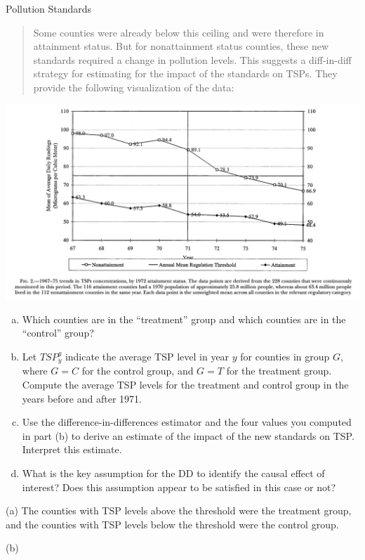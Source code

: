 \documentclass[10pt]{extarticle}
\begin{document}
\begin{problem}{Pollution Standards}
\begin{quote}
      Some counties were already below this ceiling and were therefore in attainment status. But for nonattainment status counties, these new standards required a change in pollution levels. This suggests a diff-in-diff strategy for estimating for the impact of the standards on TSPs. They provide the following visualization of the data:
    \end{quote}
    \begin{center}
      \includegraphics[width=\textwidth]{2_1_q}
    \end{center}
    \begin{enumerate}[(a)]
      \item Which counties are in the ``treatment'' group and which counties are in the ``control'' group?
      \item Let $TSP_{y}^{g}$ indicate the average TSP level in year $y$ for counties in group $G$, where $G = C$ for the control group, and $G = T$ for the treatment group. Compute the average TSP levels for the treatment and control group in the years before and after 1971.
      \item Use the difference-in-differences estimator and the four values you computed in part (b) to derive an estimate of the impact of the new standards on TSP. Interpret this estimate.
      \item What is the key assumption for the DD to identify the causal effect of interest? Does this assumption appear to be satisfied in this case or not?
    \end{enumerate}
    \tcblower
    \begin{problem}{(a)}
      The counties with TSP levels above the threshold were the treatment group, and the counties with TSP levels below the threshold were the control group.
    \end{problem}
    \begin{problem}{(b)}

\end{problem}
\end{problem}
\end{document}
